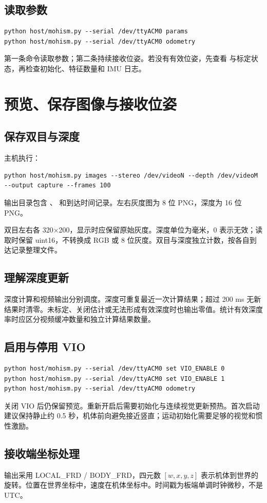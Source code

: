 \subsection{读取参数}
\begin{lstlisting}
python host/mohism.py --serial /dev/ttyACM0 params
python host/mohism.py --serial /dev/ttyACM0 odometry
\end{lstlisting}
第一条命令读取参数；第二条持续接收位姿。若没有有效位姿，先查看  与标定状态，再检查初始化、特征数量和 IMU 日志。
\newpage
\section{预览、保存图像与接收位姿}
\subsection{保存双目与深度}
主机执行：
\begin{lstlisting}
python host/mohism.py images --stereo /dev/videoN --depth /dev/videoM --output capture --frames 100
\end{lstlisting}
输出目录包含 、 和到达时间记录。左右灰度图为 8 位 PNG，深度为 16 位 PNG。

双目左右各 320$\times$200，显示时应保留原始灰度。深度单位为毫米，0 表示无效；读取时保留 uint16，不转换成 RGB 或 8 位灰度。双目与深度独立计数，按各自到达记录整理文件。

\subsection{理解深度更新}
深度计算和视频输出分别调度。深度可重复最近一次计算结果；超过 200 ms 无新结果时清零。未标定、关闭估计或无法形成有效深度时也输出零值。统计有效深度率时应区分视频缓冲数量和独立计算结果数量。

\subsection{启用与停用 VIO}
\begin{lstlisting}
python host/mohism.py --serial /dev/ttyACM0 set VIO_ENABLE 0
python host/mohism.py --serial /dev/ttyACM0 set VIO_ENABLE 1
python host/mohism.py --serial /dev/ttyACM0 odometry
\end{lstlisting}
关闭 VIO 后仍保留预览。重新开启后需要初始化与连续视觉更新预热。首次启动建议保持静止约 0.5 秒，机体前向避免接近竖直；运动初始化需要足够的视觉和惯性激励。

\subsection{接收端坐标处理}
输出采用 LOCAL\_FRD / BODY\_FRD，四元数 $[w,x,y,z]$ 表示机体到世界的旋转。位置在世界坐标中，速度在机体坐标中。时间戳为板端单调时钟微秒，不是 UTC。

